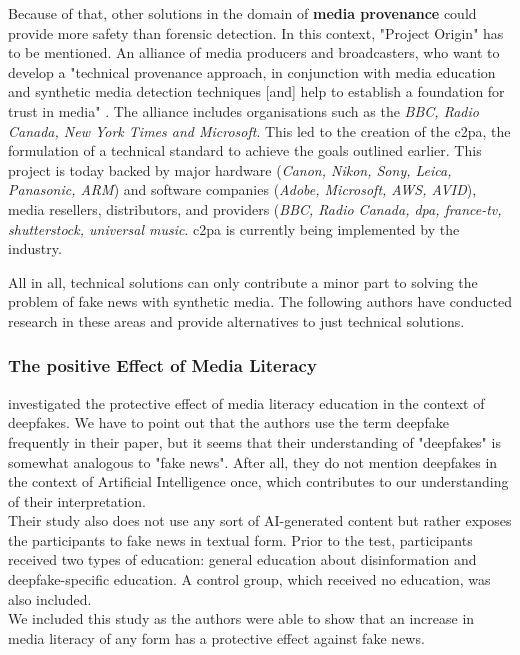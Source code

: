 \documentclass[
  a4paper,  %
  twoside,  %
  bibliography=totoc,
  headsepline,
  cleardoublepage=empty,
  parskip=half,
  draft=false
]{scrbook}
\begin{document}
Because of that, other solutions in the domain of \textbf{media provenance} could provide more safety than forensic detection. In this context, "Project Origin" has to be mentioned. An alliance of media producers and broadcasters, who want to develop a "technical provenance approach, in conjunction with media education and synthetic media detection techniques [and] help to establish a foundation for trust in media" \cite{ProjectOrigin}. The alliance includes organisations such as the \textit{BBC, Radio Canada, New York Times and Microsoft}. This led to the creation of the \gls{c2pa}, the formulation of a technical standard to achieve the goals outlined earlier. This project is today backed by major hardware (\textit{Canon, Nikon, Sony, Leica, Panasonic, ARM}) and software companies (\textit{Adobe, Microsoft, AWS, AVID}), media resellers, distributors, and providers (\textit{BBC, Radio Canada, dpa, france-tv, shutterstock, universal music}. \gls{c2pa} is currently being implemented by the industry.

All in all, technical solutions can only contribute a minor part to solving the problem of fake news with synthetic media. The following authors have conducted research in these areas and provide alternatives to just technical solutions. 

\subsubsection*{The positive Effect of Media Literacy}
\citeauthor{hwangEffectsDisinformationUsing2021} investigated the protective effect of media literacy education in the context of deepfakes. We have to point out that the authors use the term deepfake frequently in their paper, but it seems that their understanding of "deepfakes" is somewhat analogous to "fake news". After all, they do not mention deepfakes in the context of Artificial Intelligence once, which contributes to our understanding of their interpretation. \\
Their study also does not use any sort of AI-generated content but rather exposes the participants to fake news in textual form. Prior to the test, participants received two types of education: general education about disinformation and deepfake-specific education. A control group, which received no education, was also included. \\
We included this study as the authors were able to show that an increase in media literacy of any form has a protective effect against fake news.
\end{document}
